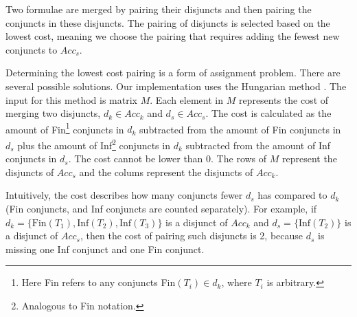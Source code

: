 \documentclass[
  digital, %
  twoside, %
  table,   %
  lof,     %
  lot,     %
]{fithesis3}
\begin{document}
Two formulae are merged by pairing their disjuncts and then pairing the conjuncts in these disjuncts. The pairing of disjuncts is selected based on the lowest cost, meaning we choose the pairing that requires adding the fewest new conjuncts to $Acc_s$. 

Determining the lowest cost pairing is a form of assignment problem. There are several possible solutions. Our implementation uses the Hungarian method \cite{hungarian_method}. The input for this method is matrix $M$. Each element in $M$ represents the cost of merging two disjuncts, $d_k \in Acc_k$ and $d_s \in Acc_s$. The cost is calculated as the amount of Fin\footnote{Here Fin refers to any conjuncts Fin$(T_i) \in d_k$, where $T_i$ is arbitrary.} conjuncts in $d_k$ subtracted from the amount of Fin conjuncts in $d_s$ plus the amount of Inf\footnote{Analogous to Fin notation.} conjuncts in $d_k$ subtracted from the amount of Inf conjuncts in $d_s$. The cost cannot be lower than 0. The rows of $M$ represent the disjuncts of $Acc_s$ and the colums represent the disjuncts of $Acc_k$.

Intuitively, the cost describes how many conjuncts fewer $d_s$ has compared to $d_k$ (Fin conjuncts, and Inf conjuncts are counted separately). For example, if $d_k = \{\text{Fin}(T_1), \text{Inf}(T_2), \text{Inf}(T_3)\}$ is a disjunct of $Acc_k$ and $d_s = \{\text{Inf}(T_2)\}$ is a disjunct of $Acc_s$, then the cost of pairing such disjuncts is 2, because $d_s$ is missing one Inf conjunct and one Fin conjunct. 
\end{document}
